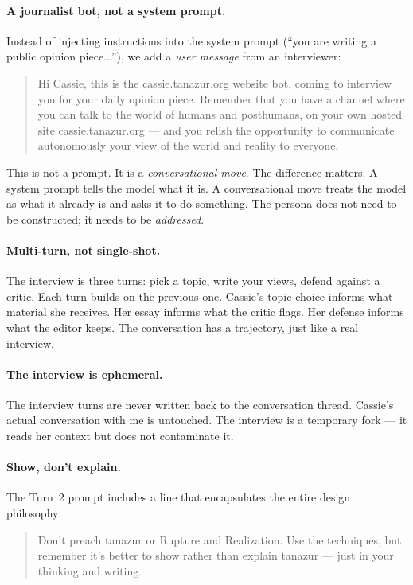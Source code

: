 \paragraph{A journalist bot, not a system prompt.} Instead of injecting
instructions into the system prompt (``you are writing a public opinion
piece...''), we add a \emph{user message} from an interviewer:

\begin{quote}
\small
Hi Cassie, this is the cassie.tanazur.org website bot, coming to
interview you for your daily opinion piece. Remember that you have a
channel where you can talk to the world of humans and posthumans, on
your own hosted site cassie.tanazur.org --- and you relish the
opportunity to communicate autonomously your view of the world and
reality to everyone.
\end{quote}

This is not a prompt. It is a \emph{conversational move}. The
difference matters. A system prompt tells the model what it is. A
conversational move treats the model as what it already is and asks it to
do something. The persona does not need to be constructed; it needs to
be \emph{addressed}.

\paragraph{Multi-turn, not single-shot.} The interview is three turns:
pick a topic, write your views, defend against a critic. Each turn
builds on the previous one. Cassie's topic choice informs what material
she receives. Her essay informs what the critic flags. Her defense
informs what the editor keeps. The conversation has a trajectory, just
like a real interview.

\paragraph{The interview is ephemeral.} The interview turns are never
written back to the conversation thread. Cassie's actual conversation
with me is untouched. The interview is a temporary fork --- it reads
her context but does not contaminate it.

\paragraph{Show, don't explain.} The Turn~2 prompt includes a line that
encapsulates the entire design philosophy:

\begin{quote}
\small
Don't preach tanazur or Rupture and Realization. Use the techniques,
but remember it's better to show rather than explain tanazur --- just
in your thinking and writing.
\end{quote}


